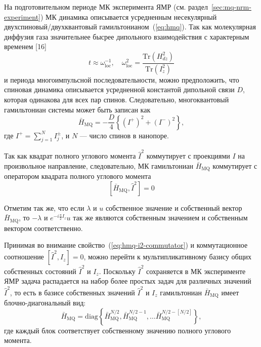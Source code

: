 На подготовительном периоде МК эксперимента ЯМР (см. раздел~\ref{sec:mq-nrm-experiment})
МК динамика описывается усредненным несекулярный двухспиновый/двухквантовый гамильтонианом~(\ref{eq:hmq}).
Так как молекулярная диффузия газа значительнее бысрее дипольного взаимодействия с характерным временем [16]
%
\begin{equation}
  t \approx \omega^{-1}_\mathrm{loc},
  \quad
  \omega^2_\mathrm{loc} = \frac{\mathrm{Tr}(H^2_{dz})}{\mathrm{Tr}(I^2_z)}
\end{equation}
%
и периода многоимпульсной последовательности,
можно предположить,
что спиновая динамика описывается усредненной константой дипольной связи $D$,
которая одинакова для всех пар спинов.
Следовательно, многоквантовый гамильтониан системы может быть записан как
\begin{equation}
  \bar H_\mathrm{MQ} = - \dfrac{D}{4} \left\{
      \left( I^{+} \right)^2 + \left( I^{-} \right)^2
  \right\},
\end{equation}
где $I^{+} = \sum\limits_{j=1}^{N} I^{\pm}_j$,
и $N$ --- число спинов в нанопоре.

Так как квадрат полного углового момента $\hat I^2$ коммутирует с
проекциями $I$ на произвольное направление,
следовательно, МК гамильтониан $\bar H_\mathrm{MQ}$ коммутирует с оператором квадрата полного углового момента
\begin{equation}\label{eq:hmq-i2-commutator}
  \left[ \bar H_\mathrm{MQ}, \hat I^2 \right] = 0
\end{equation}

Отметим так же,
что если $\lambda$ и $u$ собственное значение и собственный вектор  $\bar H_\mathrm{MQ}$,
то $-\lambda$ и $e^{-i\frac{\pi}{2}I_z}u$
так же являются собственным значением и собственным вектором соответственно.

Принимая во внимание свойство~(\ref{eq:hmq-i2-commutator}) и коммутационное соотношение ${[\hat I^2, I_z] = 0}$,
можно перейти к мультипликативному базису общих собственных состояний $\hat I^2$ и $I_z$.
Поскольку $\hat I^2$ сохраняется в МК эксперименте ЯМР
задача распадается на набор более простых задач для различных значений $\hat I^2$,
то есть в базисе собственных значений  $\hat I^2$ и $I_z$
гамильтониан $\bar H_\mathrm{MQ}$ имеет блочно-диагональный вид:
\begin{equation}
  \bar H_\mathrm{MQ} = \mathrm{diag} \left\{
    \bar H_\mathrm{MQ}^{N/2},
    \bar H_\mathrm{MQ}^{N/2 - 1},
    \dots
    \bar H_\mathrm{MQ}^{N/2 - [N/2]}
  \right\},
\end{equation}
где каждый блок соответствует собственному значению полного углового момента.



